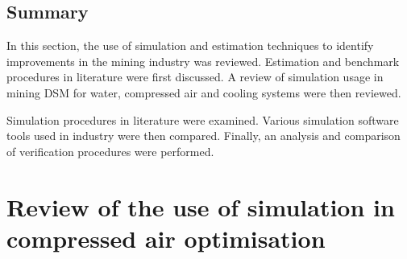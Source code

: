  	\subsection{Summary}
 	In this section, the use of simulation and estimation techniques to identify improvements in the mining industry was reviewed. Estimation and benchmark procedures in literature were first discussed. A review of simulation usage in mining DSM for water, compressed air and cooling systems were then reviewed.
 	
 	Simulation procedures in literature were examined. Various simulation software tools used in industry were then compared. Finally, an analysis and comparison of verification procedures were performed.
 	
\section{Review of the use of simulation in compressed air optimisation}
\label{CompressorSimulation Literature} \label{simplfiedModels}
